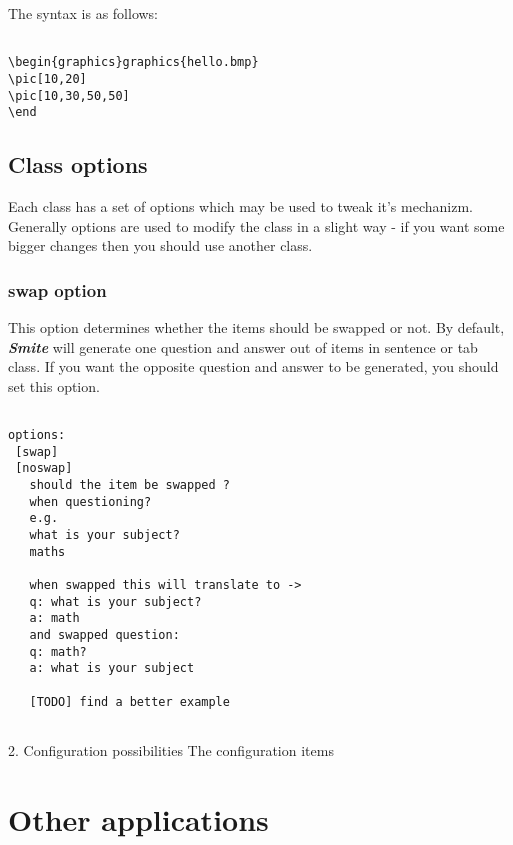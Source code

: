 \documentclass[a4paper,11pt]{article}
\newcommand{\smite}{\emph{\textbf{Smite{}}}}
\begin{document}
The syntax is as follows:

\begin{verbatim}

\begin{graphics}graphics{hello.bmp}
\pic[10,20]
\pic[10,30,50,50]
\end

\end{verbatim}







\subsection{Class options}

Each class has a set of options which may be used to tweak it's mechanizm.
Generally options are used to modify the class in a slight way - if you want
some bigger changes then you should use another class.


\subsubsection{swap option}

This option determines whether the items should be swapped or not. By default,
\smite{} will generate one question and answer out of items in sentence or tab
class.  If you want the opposite question and answer to be generated, you
should set this option.

\begin{verbatim}

options:
 [swap]
 [noswap]
   should the item be swapped ?
   when questioning?
   e.g.
   what is your subject?
   maths

   when swapped this will translate to ->
   q: what is your subject?
   a: math
   and swapped question:
   q: math?
   a: what is your subject

   [TODO] find a better example


\end{verbatim}





2. Configuration possibilities
The configuration items


\section{Other applications}
\end{document}
